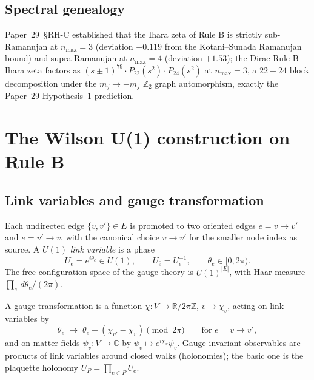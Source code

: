 \documentclass[11pt]{article}
\begin{document}
\subsection{Spectral genealogy}

Paper~29~\S{}RH-C established that the Ihara zeta of Rule B is strictly
sub-Ramanujan at $n_\text{max}=3$ (deviation $-0.119$ from the Kotani--Sunada
Ramanujan bound) and supra-Ramanujan at $n_\text{max}=4$ (deviation $+1.53$);
the Dirac-Rule-B Ihara zeta factors as
$(s\pm 1)^{79}\cdot P_{22}(s^2)\cdot P_{24}(s^2)$ at $n_\text{max}=3$, a
$22+24$ block decomposition under the $m_j\to-m_j$ $\mathbb{Z}_2$ graph
automorphism, exactly the Paper~29 Hypothesis~1 prediction.

\section{The Wilson U(1) construction on Rule B}
\label{sec:wilson_construction}

\subsection{Link variables and gauge transformation}
\label{sec:link_variables}

Each undirected edge $\{v,v'\}\in E$ is promoted to two oriented edges
$e=v\to v'$ and $\bar e=v'\to v$, with the canonical choice
$v\to v'$ for the smaller node index as source. A $U(1)$ \emph{link variable}
is a phase
\begin{equation}
U_e=e^{i\theta_e}\in U(1),
\qquad U_{\bar e}=U_e^{-1},\qquad
\theta_e\in[0,2\pi).
\end{equation}
The free configuration space of the gauge theory is $U(1)^{|E|}$, with Haar
measure $\prod_e\,d\theta_e/(2\pi)$.

A gauge transformation is a function $\chi:V\to\mathbb{R}/2\pi\mathbb{Z}$,
$v\mapsto\chi_v$, acting on link variables by
\begin{equation}
\theta_e\;\mapsto\;\theta_e+(\chi_{v'}-\chi_v)\pmod{2\pi}
\qquad\text{for }e=v\to v',
\end{equation}
and on matter fields $\psi_v:V\to\mathbb{C}$ by $\psi_v\mapsto e^{i\chi_v}\psi_v$.
Gauge-invariant observables are products of link variables around closed walks
(holonomies); the basic one is the plaquette holonomy
$U_P=\prod_{e\in P}U_e$.
\end{document}
